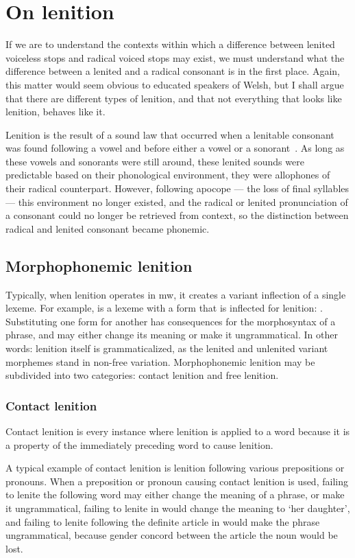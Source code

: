 \section{On lenition}
\label{sec:lenition}
If we are to understand the contexts within which a difference between lenited voiceless stops and radical voiced stops may exist,
we must understand what the difference between a lenited and a radical consonant is in the first place. 
Again, this matter would seem obvious to educated speakers of Welsh, 
but I shall argue that there are different types of lenition, 
and that not everything that looks like lenition, behaves like it.

Lenition is the result of a sound law that occurred when a lenitable consonant was found following a vowel and before either a vowel or a sonorant~\autocite[96]{mccone_towards_1996}. 
As long as these vowels and sonorants were still around, these lenited sounds were predictable based on their phonological environment, \ie they were allophones of their radical counterpart. 
However, following apocope --- the loss of final syllables --- this environment no longer existed, and the radical or lenited pronunciation of a consonant could no longer be retrieved from context, so the distinction between radical and lenited consonant became phonemic.

\subsection{Morphophonemic lenition}
\label{sec:morph-lenit}
Typically, when lenition operates in \gls{mw}, it creates a variant inflection of a single lexeme. 
For example,  is a lexeme with a form that is inflected for lenition: . 
Substituting one form for another has consequences for the morphosyntax of a phrase, and may either change its meaning or make it ungrammatical.
In other words: lenition itself is grammaticalized, as the lenited and unlenited variant morphemes stand in non-free variation.
Morphophonemic lenition may be subdivided into two categories: contact lenition and free lenition.
\subsubsection{Contact lenition}
\label{sec:contact-lenition}
Contact lenition is every instance where lenition is applied to a word because it is a property of the immediately preceding word to cause lenition. 

A typical example of contact lenition is lenition following various prepositions or pronouns. 
When a preposition or pronoun causing contact lenition is used, failing to lenite the following word may either change the meaning of a phrase, or make it ungrammatical, \eg failing to lenite  in  would change the meaning to `her daughter', and failing to lenite following the definite article in  would make the phrase ungrammatical, because  gender concord between the article the noun would be lost.


